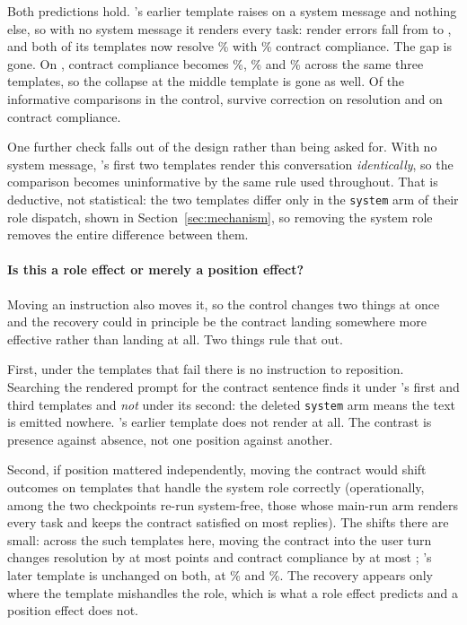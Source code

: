 Both predictions hold. \ShortMistral's earlier template raises on a system message and nothing else,
so with no system message it renders every task: render errors fall from \MistralRenderErr{} to
\NSFRenderErrors{}, and both of its templates now resolve \SFResMistralA\% with \SFConMistralA\%
contract compliance. The gap is gone. On \ShortPhi{}, contract compliance becomes \SFConPhiA\%,
\SFConPhiB\% and \SFConPhiC\% across the same three templates, so the collapse at the middle template
is gone as well. Of the \NSFFamily{} informative comparisons in the control, \NSFSigRes{} survive
correction on resolution and \NSFSigCon{} on contract compliance.

One further check falls out of the design rather than being asked for. With no system message,
\ShortPhi's first two templates render this conversation \emph{identically}, so the comparison
becomes uninformative by the same rule used throughout. That is deductive, not statistical: the two
templates differ only in the \texttt{system} arm of their role dispatch, shown in
Section~\ref{sec:mechanism}, so removing
the system role removes the entire difference between them.

\paragraph{Is this a role effect or merely a position effect?} Moving an instruction also moves it,
so the control changes two things at once and the recovery could in principle be the contract landing
somewhere more effective rather than landing at all. Two things rule that out.

First, under the templates that fail there is no instruction to reposition. Searching the rendered
prompt for the contract sentence finds it under \ShortPhi's first and third templates and \emph{not}
under its second: the deleted \texttt{system} arm means the text is emitted nowhere. \ShortMistral's
earlier template does not render at all. The contrast is presence against absence, not one position
against another.

Second, if position mattered independently, moving the contract would shift outcomes on templates
that handle the system role correctly (operationally, among the two checkpoints re-run
system-free, those whose main-run arm renders every task and keeps the contract satisfied on most
replies). The shifts there are small: across the \NHealthyTemplates{} such
templates here, moving the contract into the user turn changes resolution by at most
\MaxHealthyResShift{} points and contract compliance by at most \MaxHealthyConShift{}; \ShortMistral's
later template is unchanged on both, at \ResMistralB\% and \ConMistralB\%. The recovery appears only
where the template mishandles the role, which is what a role effect predicts and a position effect
does not.

